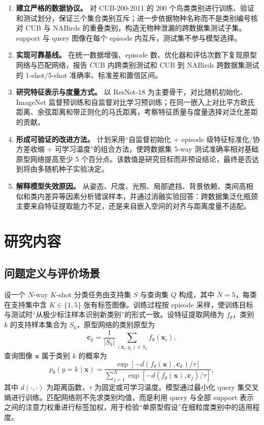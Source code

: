 \documentclass[UTF8,zihao=-4,scheme=chinese]{ctexart}
\begin{document}
\begin{enumerate}[label=\arabic*.]
  \item \textbf{建立严格的数据协议。} 对 CUB-200-2011 的 200 个鸟类类别进行训练、验证和测试划分，保证三个集合类别互斥；进一步依据物种名称而不是类别编号核对 CUB 与 NABirds 的重叠类别，构造无物种泄漏的跨数据集测试子集。support 与 query 图像在每个 episode 内互斥，测试集不参与模型选择。
  \item \textbf{实现可靠基线。} 在统一数据增强、episode 数、优化器和评估次数下复现原型网络与匹配网络，报告 CUB 内跨类别测试和 CUB 到 NABirds 跨数据集测试的 1-shot/5-shot 准确率、标准差和置信区间。
  \item \textbf{研究特征表示与度量方式。} 以 ResNet-18 为主要骨干，对比随机初始化、ImageNet 监督预训练和自监督对比学习预训练；在同一嵌入上对比平方欧氏距离、余弦距离和带正则化的马氏距离，考察特征质量与度量选择对泛化差距的贡献。
  \item \textbf{形成可验证的改进方法。} 计划采用“自监督初始化 + episode 级特征标准化/协方差收缩 + 可学习温度”的组合方法，使跨数据集 5-way 测试准确率相对基础原型网络提高至少 5 个百分点。该数值是研究目标而非预设结论，最终是否达到将由多随机种子实验决定。
  \item \textbf{解释模型失效原因。} 从姿态、尺度、光照、局部遮挡、背景依赖、类间高相似和类内差异等因素分析错误样本，并通过消融实验回答：跨数据集泛化瓶颈主要来自特征提取能力不足，还是来自嵌入空间的对齐与距离度量不适配。
\end{enumerate}

\section{研究内容}

\subsection{问题定义与评价场景}

设一个 $N$-way $K$-shot 分类任务由支持集 $S$ 与查询集 $Q$ 构成，其中 $N=5$，每类在支持集中含 $K\in\{1,5\}$ 张有标签图像。训练过程按 episode 采样，使训练目标与测试时“从极少标注样本识别新类别”的形式一致。设特征提取网络为 $f_{\theta}$，类别 $k$ 的支持样本集合为 $S_k$，原型网络的类别原型为
\begin{equation}
  \bm{c}_k=\frac{1}{|S_k|}\sum_{(\bm{x}_i,y_i)\in S_k}f_{\theta}(\bm{x}_i),
\end{equation}
查询图像 $\bm{x}$ 属于类别 $k$ 的概率为
\begin{equation}
  p_{\theta}(y=k\mid\bm{x})=
  \frac{\exp[-d(f_{\theta}(\bm{x}),\bm{c}_k)/\tau]}
  {\sum_{j=1}^{N}\exp[-d(f_{\theta}(\bm{x}),\bm{c}_j)/\tau]},
\end{equation}
其中 $d(\cdot,\cdot)$ 为距离函数，$\tau$ 为固定或可学习温度。模型通过最小化 query 集交叉熵进行训练。匹配网络则不先求类别均值，而是利用 query 与全部 support 表示之间的注意力权重进行标签加权，用于检验“单原型假设”在细粒度类别中的适用程度\cite{vinyals2016matching,snell2017prototypical}。
\end{document}
